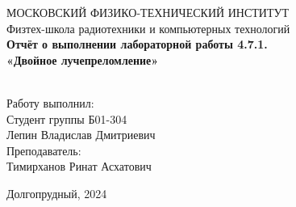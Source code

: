\begin{center}
МОСКОВСКИЙ ФИЗИКО-ТЕХНИЧЕСКИЙ ИНСТИТУТ \\

\hfill \break
Физтех-школа радиотехники и компьютерных технологий\\
\vspace{5cm}
\large{\textbf{Отчёт о выполнении лабораторной работы 4.7.1. \\ «Двойное лучепреломление»}}\\
\hfill \break
\\
\end{center}

\vspace{5cm}
 
\begin{flushright}
Работу выполнил:\\
Студент группы Б01-304\\
Лепин Владислав Дмитриевич\\
Преподаватель:\\
Тимирханов Ринат Асхатович\\
\end{flushright}
 
\vfill


\begin{center} Долгопрудный, 2024 \end{center}

\thispagestyle{empty}
\newpage